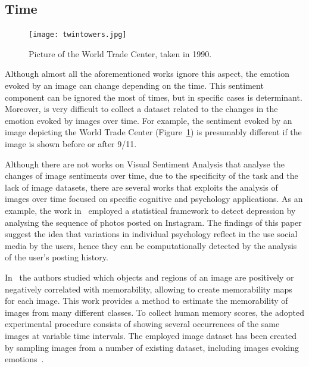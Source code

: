 
\subsection{Time}
\begin{figure}[t]
	\centering
	\texttt{[image: twintowers.jpg]}
	\caption{Picture of the World Trade Center, taken in 1990.}
	\label{figTwintowers}
\end{figure}
Although almost all the aforementioned works ignore this aspect, the emotion evoked by an image can change depending on the time. 
This sentiment component can be ignored the most of times, but in specific cases is determinant. Moreover, is very difficult to collect a dataset related to the changes in the emotion evoked by images over time.
For example, the sentiment evoked by an image depicting the World Trade Center (Figure~\ref{figTwintowers}) is presumably different if the image is shown before or after 9/11.

Although there are not works on Visual Sentiment Analysis that analyse the changes of image sentiments over time, due to the specificity of the task and the lack of image datasets, there are several works that exploits the analysis of images over time focused on specific cognitive and psychology applications. 
As an example, the work in~\cite{reece2016instagram} employed a statistical framework to detect depression by analysing the sequence of photos posted on Instagram. The findings of this paper suggest the idea that variations in individual psychology reflect in the use social media by the users, hence they can be computationally detected by the analysis of the user's posting history.

In~\cite{khosla2012memorability} the authors studied which objects and regions of an image are positively or negatively correlated with memorability, allowing to create memorability maps for each image. This work provides a method to estimate the memorability of images from many different classes. To collect human memory scores, the adopted experimental procedure consists of showing several occurrences of the same images at variable time intervals. The employed image dataset has been created by sampling images from a number of existing dataset, including images evoking emotions~\cite{machajdik2010affective}.


